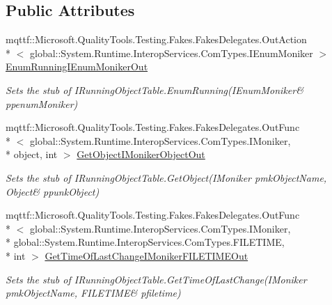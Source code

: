 \subsection*{Public Attributes}
\begin{DoxyCompactItemize}
\item 
mqttf\-::\-Microsoft.\-Quality\-Tools.\-Testing.\-Fakes.\-Fakes\-Delegates.\-Out\-Action\\*
$<$ global\-::\-System.\-Runtime.\-Interop\-Services.\-Com\-Types.\-I\-Enum\-Moniker $>$ \hyperlink{class_system_1_1_runtime_1_1_interop_services_1_1_com_types_1_1_fakes_1_1_stub_i_running_object_table_a1922e5f4f422c1999a75e54779936aff}{Enum\-Running\-I\-Enum\-Moniker\-Out}
\begin{DoxyCompactList}\small\item\em Sets the stub of I\-Running\-Object\-Table.\-Enum\-Running(I\-Enum\-Moniker\& ppenum\-Moniker)\end{DoxyCompactList}\item 
mqttf\-::\-Microsoft.\-Quality\-Tools.\-Testing.\-Fakes.\-Fakes\-Delegates.\-Out\-Func\\*
$<$ global\-::\-System.\-Runtime.\-Interop\-Services.\-Com\-Types.\-I\-Moniker, \\*
object, int $>$ \hyperlink{class_system_1_1_runtime_1_1_interop_services_1_1_com_types_1_1_fakes_1_1_stub_i_running_object_table_a03e2548eb8af3a4d9d7c79faf93214fa}{Get\-Object\-I\-Moniker\-Object\-Out}
\begin{DoxyCompactList}\small\item\em Sets the stub of I\-Running\-Object\-Table.\-Get\-Object(I\-Moniker pmk\-Object\-Name, Object\& ppunk\-Object)\end{DoxyCompactList}\item 
mqttf\-::\-Microsoft.\-Quality\-Tools.\-Testing.\-Fakes.\-Fakes\-Delegates.\-Out\-Func\\*
$<$ global\-::\-System.\-Runtime.\-Interop\-Services.\-Com\-Types.\-I\-Moniker, \\*
global\-::\-System.\-Runtime.\-Interop\-Services.\-Com\-Types.\-F\-I\-L\-E\-T\-I\-M\-E, \\*
int $>$ \hyperlink{class_system_1_1_runtime_1_1_interop_services_1_1_com_types_1_1_fakes_1_1_stub_i_running_object_table_af34c767d0909bb5c05389fbacfe521f9}{Get\-Time\-Of\-Last\-Change\-I\-Moniker\-F\-I\-L\-E\-T\-I\-M\-E\-Out}
\begin{DoxyCompactList}\small\item\em Sets the stub of I\-Running\-Object\-Table.\-Get\-Time\-Of\-Last\-Change(I\-Moniker pmk\-Object\-Name, F\-I\-L\-E\-T\-I\-M\-E\& pfiletime)\end{DoxyCompactList}\item 

\end{DoxyCompactItemize}
